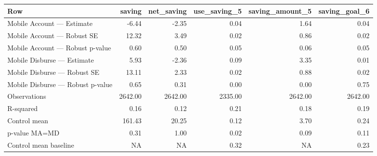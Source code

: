 
\begin{tabular}{lrrrrr}
\toprule
Row & saving & net\_saving & use\_saving\_5 & saving\_amount\_5 & saving\_goal\_6\\
\midrule
Mobile Account — Estimate & -6.44 & -2.35 & 0.04 & 1.64 & 0.04\\
Mobile Account — Robust SE & 12.32 & 3.49 & 0.02 & 0.86 & 0.02\\
Mobile Account — Robust p-value & 0.60 & 0.50 & 0.05 & 0.06 & 0.05\\
Mobile Disburse — Estimate & 5.93 & -2.36 & 0.09 & 3.35 & 0.01\\
Mobile Disburse — Robust SE & 13.11 & 2.33 & 0.02 & 0.88 & 0.02\\
\addlinespace
Mobile Disburse — Robust p-value & 0.65 & 0.31 & 0.00 & 0.00 & 0.75\\
Observations & 2642.00 & 2642.00 & 2335.00 & 2642.00 & 2642.00\\
R-squared & 0.16 & 0.12 & 0.21 & 0.18 & 0.19\\
Control mean & 161.43 & 20.25 & 0.12 & 3.70 & 0.24\\
p-value MA=MD & 0.31 & 1.00 & 0.02 & 0.09 & 0.11\\
\addlinespace
Control mean baseline & NA & NA & 0.32 & NA & 0.23\\
\bottomrule
\end{tabular}
